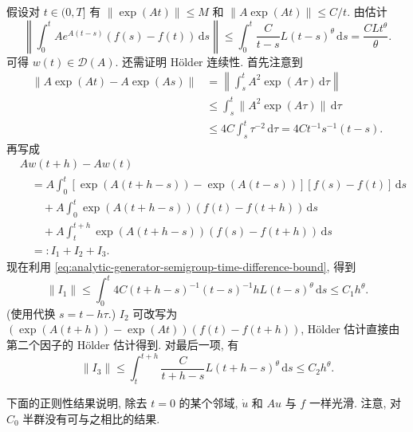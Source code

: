 \begin{Proof}
假设对 $t\in(0,T]$ 有 $\|\exp(At)\|\leq M$ 和 $\|A\exp(At)\|\leq C/t$. 由估计
\begin{equation}\label{eq:analytic-holder-data-difference-in-generator-domain-bound}
\left\|\int_0^t Ae^{A(t-s)}(f(s)-f(t))\,\mathrm{d}s\right\|\leq\int_0^t\dfrac{C}{t-s}L(t-s)^\theta\,\mathrm{d}s=\dfrac{CLt^\theta}{\theta}.
\end{equation}
可得 $w(t)\in\mathcal{D}(A)$. 还需证明 Hölder 连续性. 首先注意到
\begin{equation}\label{eq:analytic-generator-semigroup-time-difference-bound}
\begin{aligned}\|A\exp(At)-A\exp(As)\|&=\left\|\int_s^t A^2\exp(A\tau)\,\mathrm{d}\tau\right\|\\&\leq\int_s^t\|A^2\exp(A\tau)\|\,\mathrm{d}\tau\\&\leq4C\int_s^t\tau^{-2}\,\mathrm{d}\tau=4Ct^{-1}s^{-1}(t-s).\end{aligned}
\end{equation}
再写成\[\begin{aligned}
&Aw(t+h)-Aw(t)\\
&\quad=A\int_0^t[\exp(A(t+h-s))-\exp(A(t-s))][f(s)-f(t)]\,\mathrm{d}s\\
&\qquad+A\int_0^t\exp(A(t+h-s))(f(t)-f(t+h))\,\mathrm{d}s\\
&\qquad+A\int_t^{t+h}\exp(A(t+h-s))(f(s)-f(t+h))\,\mathrm{d}s\\
&\quad=:I_1+I_2+I_3.
\end{aligned}\]现在利用 \eqref{eq:analytic-generator-semigroup-time-difference-bound}, 得到
\begin{equation}\label{eq:analytic-holder-difference-convolution-first-term-bound}
\|I_1\|\leq\int_0^t4C(t+h-s)^{-1}(t-s)^{-1}hL(t-s)^\theta\,\mathrm{d}s\leq C_1h^\theta.
\end{equation}
(使用代换 $s=t-h\tau$.) $I_2$ 可改写为 $(\exp(A(t+h))-\exp(At))(f(t)-f(t+h))$, Hölder 估计直接由第二个因子的 Hölder 估计得到. 对最后一项, 有
\begin{equation}\label{eq:analytic-holder-difference-convolution-third-term-bound}
\|I_3\|\leq\int_t^{t+h}\dfrac{C}{t+h-s}L(t+h-s)^\theta\,\mathrm{d}s\leq C_2h^\theta.
\end{equation}

\end{Proof}

下面的正则性结果说明, 除去 $t=0$ 的某个邻域, $\dot u$ 和 $Au$ 与 $f$ 一样光滑. 注意, 对 $C_0$ 半群没有可与之相比的结果.

